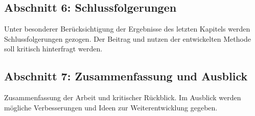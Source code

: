 		\subsection*{Abschnitt 6: Schlussfolgerungen}
			Unter besonderer Berücksichtigung der Ergebnisse des letzten Kapitels werden Schlussfolgerungen gezogen. 
			Der Beitrag und nutzen der entwickelten Methode soll kritisch hinterfragt werden.

		\subsection*{Abschnitt 7: Zusammenfassung und Ausblick}
			Zusammenfassung der Arbeit und kritischer Rückblick. Im Ausblick werden mögliche Verbesserungen und Ideen zur Weiterentwicklung gegeben.  